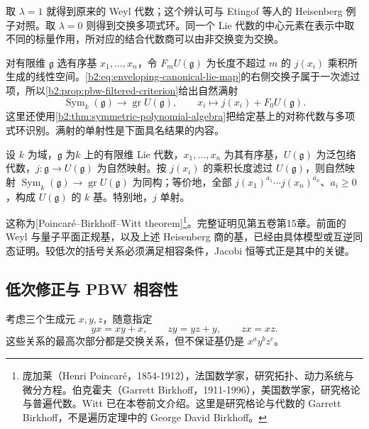 取 \(\lambda=1\) 就得到原来的 Weyl 代数；这个辨认可与 Etingof 等人的 Heisenberg 例子对照\cite[Example 2.9.13, p. 24]{EtingofEtAl2011RepresentationTheory}。取 \(\lambda=0\) 则得到交换多项式环。同一个 Lie 代数的中心元素在表示中取不同的标量作用，所对应的结合代数商可以由非交换变为交换。

\ProseParagraphBreak
对有限维 \(\mathfrak g\) 选有序基 \(x_1,\ldots,x_n\)，令 \(F_mU(\mathfrak g)\) 为长度不超过 \(m\) 的 \(j(x_i)\) 乘积所生成的线性空间。\eqref{b2:eq:enveloping-canonical-lie-map}的右侧交换子属于一次滤过项，所以\cref{b2:prop:pbw-filtered-criterion}给出自然满射
\[
	\operatorname{Sym}_k(\mathfrak g)\longrightarrow\operatorname{gr}U(\mathfrak g), \qquad x_i\longmapsto j(x_i)+F_0U(\mathfrak g).
\]
这里还使用\cref{b2:thm:symmetric-polynomial-algebra}把给定基上的对称代数与多项式环识别。满射的单射性是下面具名结果的内容。

\begin{claim}[PBW]\label{b2:claim:pbw-enveloping-preview}
	设 \(k\) 为域，\(\mathfrak g\) 为\(k\) 上的有限维 Lie 代数，\(x_1,\ldots,x_n\) 为其有序基，\(U(\mathfrak g)\) 为泛包络代数，\(j:\mathfrak g\rightarrow U(\mathfrak g)\) 为自然映射。按 \(j(x_i)\) 的乘积长度滤过 \(U(\mathfrak g)\)，则自然映射 \(\operatorname{Sym}_k(\mathfrak g)\rightarrow\operatorname{gr}U(\mathfrak g)\) 为同构；等价地，全部 \(j(x_1)^{a_1}\cdots j(x_n)^{a_n}\)、\(a_i\geq0\)，构成 \(U(\mathfrak g)\) 的 \(k\) 基。特别地，\(j\) 单射。
\end{claim}

这称为[Poincaré--Birkhoff--Witt theorem]\footnote{庞加莱（Henri Poincaré，1854-1912），法国数学家，研究拓扑、动力系统与微分方程。伯克霍夫（Garrett Birkhoff，1911-1996），美国数学家，研究格论与普遍代数。Witt 已在本卷前文介绍。这里是研究格论与代数的 Garrett Birkhoff，不是遍历定理中的 George David Birkhoff。}。完整证明见第五卷第15章。前面的 Weyl 与量子平面正规基，以及上述 Heisenberg 商的基，已经由具体模型或互逆同态证明。较低次的括号关系必须满足相容条件，Jacobi 恒等式正是其中的关键。

\subsection{低次修正与 PBW 相容性}
\label{b2:subsec:2004:03}

考虑三个生成元 \(x,y,z\)，随意指定
\[
	yx=xy+x,\qquad zy=yz+y,\qquad zx=xz.
\]
这些关系的最高次部分都是交换关系，但不保证基仍是 \(x^ay^bz^c\)。

